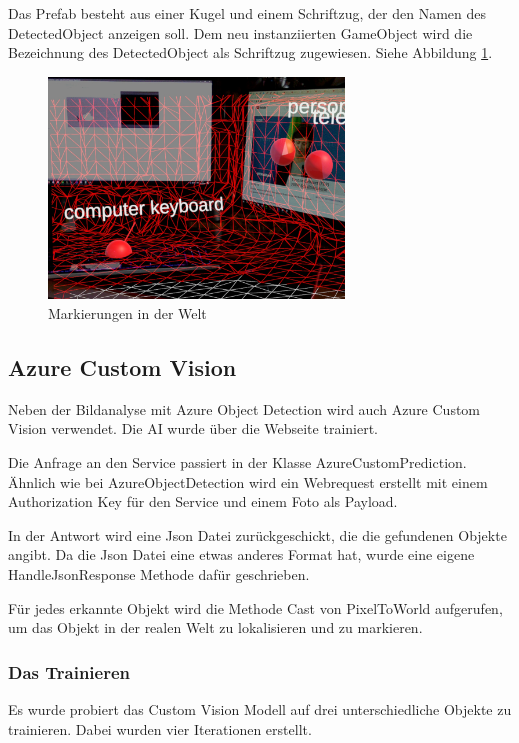 \documentclass[german,a4paper, 12pt]{llncs}
\begin{document}
Das Prefab besteht aus einer Kugel und einem Schriftzug, der den Namen des DetectedObject anzeigen soll. Dem neu instanziierten GameObject wird die Bezeichnung des DetectedObject als Schriftzug zugewiesen. Siehe Abbildung \ref{image:labels}.

\begin{figure}[H]
	\centering
	\includegraphics[width=0.7\textwidth]{images/ML_labels.jpg}
	\caption[]{Markierungen in der Welt}
	\label{image:labels}
\end{figure}

\subsection{Azure Custom Vision}

Neben der Bildanalyse mit Azure Object Detection wird auch Azure Custom Vision verwendet.
Die AI wurde über die Webseite trainiert.

Die Anfrage an den Service passiert in der Klasse AzureCustomPrediction. Ähnlich wie bei AzureObjectDetection wird ein Webrequest erstellt mit einem Authorization Key für den Service und einem Foto als Payload.

In der Antwort wird eine Json Datei zurückgeschickt, die die gefundenen Objekte angibt.
Da die Json Datei eine etwas anderes Format hat, wurde eine eigene HandleJsonResponse Methode dafür geschrieben.

Für jedes erkannte Objekt wird die Methode Cast von PixelToWorld aufgerufen, um das Objekt in der realen Welt zu lokalisieren und zu markieren.

\subsubsection{Das Trainieren}

Es wurde probiert das Custom Vision Modell auf drei unterschiedliche Objekte zu trainieren.
Dabei wurden vier Iterationen erstellt. 
\end{document}
